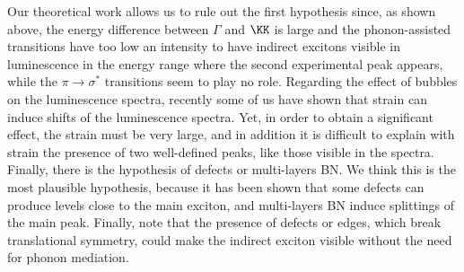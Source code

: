 Our theoretical work allows us to rule out the first hypothesis since, as shown above, the energy difference between $\Gamma$ and $\KK$ is large and the phonon-assisted transitions have too low an intensity to have indirect excitons visible in luminescence in the energy range where the second experimental peak appears, while the $\pi\rightarrow\sigma^*$ transitions seem to play no role. Regarding the effect of bubbles on the luminescence spectra, recently some of us have shown that strain can induce shifts of the luminescence spectra.\cite{lechifflart2022excitons}
Yet, in order to obtain a significant effect, the strain must be very large, and in addition it is difficult to explain with strain the presence of two well-defined peaks, like those visible in the spectra. 
Finally, there is the hypothesis of defects or multi-layers BN. We think this is the most plausible hypothesis, because it has been shown that some defects can produce levels close to the main exciton,\cite{attaccalite2011coupling} and multi-layers BN induce splittings of the main peak.\cite{paleari2018excitons} 
Finally, note that the presence of defects or edges, which break translational symmetry, could make the indirect exciton visible without the need for phonon mediation.\cite{feierabend2017proposal}

%
